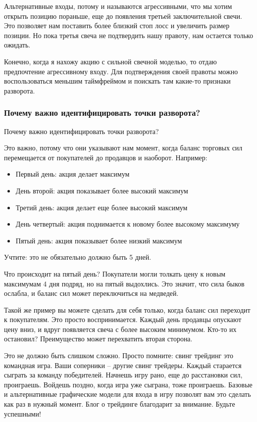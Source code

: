 \documentclass[a5paper]{article}
\begin{document}
Альтернативные входы, потому и называются агрессивными, что мы хотим открыть позицию пораньше, еще до появления третьей заключительной свечи. Это позволяет нам поставить более близкий стоп лосс и увеличить размер позиции. Но пока третья свеча не подтвердить нашу правоту, нам остается только ожидать.

Конечно, когда я нахожу акцию с сильной свечной моделью, то отдаю
предпочтение агрессивному входу. Для подтверждения своей правоты можно
воспользоваться меньшим таймфреймом и поискать там какие-то признаки
разворота.

\subsubsection{Почему важно идентифицировать точки разворота?}

Почему важно идентифицировать точки разворота?

Это важно, потому что они указывают нам момент, когда баланс торговых сил перемещается от покупателей до продавцов и наоборот. Например:
\begin{itemize}
\item     Первый день: акция делает максимум
\item     День второй: акция показывает более высокий максимум
\item     Третий день: акция делает еще более высокий максимум
\item     День четвертый: акция поднимается к новому более высокому максимуму
\item     Пятый день: акция показывает более низкий максимум
\end{itemize}

Учтите: это не обязательно должно быть 5 дней.

Что происходит на пятый день? Покупатели могли толкать цену к новым максимумам 4 дня подряд, но на пятый выдохлись. Это значит, что сила быков ослабла, и баланс сил может переключиться на медведей.

Такой же пример вы можете сделать для себя только, когда баланс сил переходит к покупателям. Это просто воспринимается. Каждый день продавцы опускают цену вниз, и вдруг появляется свеча с более высоким минимумом. Кто-то их остановил? Преимущество может перехватить вторая сторона.

Это не должно быть слишком сложно. Просто помните: свинг трейдинг это командная игра. Ваши соперники – другие свинг трейдеры. Каждый старается сыграть за команду победителей. Начнешь игру рано, еще до расстановки сил, проиграешь. Войдешь поздно, когда игра уже сыграна, тоже проиграешь. Базовые и альтернативные графические модели для входа в игру позволят вам это сделать как раз в нужный момент. Блог о трейдинге благодарит за внимание. Будьте успешными!
\end{document}
